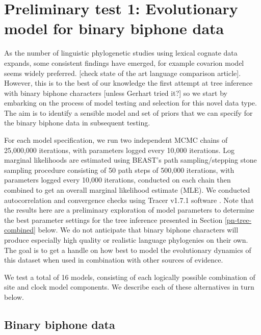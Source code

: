 \documentclass[]{article}
\begin{document}
\hypertarget{prelim-1}{%
\section{Preliminary test 1: Evolutionary model for binary biphone data}\label{prelim-1}}

As the number of linguistic phylogenetic studies using lexical cognate data expands, some consistent findings have emerged, for example covarion model seems widely preferred. {[}check state of the art language comparison article{]}. However, this is to the best of our knowledge the first attempt at tree inference with binary biphone characters {[}unless Gerhart tried it?{]} so we start by embarking on the process of model testing and selection for this novel data type. The aim is to identify a sensible model and set of priors that we can specify for the binary biphone data in subsequent testing.

For each model specification, we run two independent MCMC chains of 25,000,000 iterations, with parameters logged every 10,000 iterations. Log marginal likelihoods are estimated using BEAST's path sampling/stepping stone sampling procedure \autocite{baele_accurate_2013} consisting of 50 path steps of 500,000 iterations, with parameters logged every 10,000 iterations, conducted on each chain then combined to get an overall marginal likelihood estimate (MLE). We conducted autocorrelation and convergence checks using Tracer v1.7.1 software \autocite{rambaut_posterior_2018}. Note that the results here are a preliminary exploration of model parameters to determine the best parameter settings for the tree inference presented in Section \ref{pn-tree-combined} below. We do not anticipate that binary biphone characters will produce especially high quality or realistic language phylogenies on their own. The goal is to get a handle on how best to model the evolutionary dynamics of this dataset when used in combination with other sources of evidence.

We test a total of 16 models, consisting of each logically possible combination of site and clock model components. We describe each of these alternatives in turn below.

\hypertarget{binary-biphone-data}{%
\subsection{Binary biphone data}\label{binary-biphone-data}}
\end{document}

